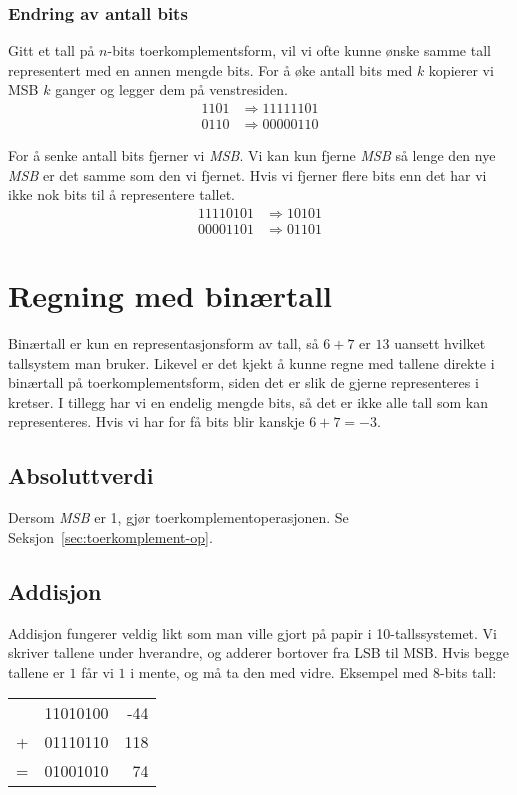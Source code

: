 \documentclass[12pt,a4paper,norsk]{article}
\begin{document}
\subsubsection{Endring av antall bits}
Gitt et tall på $n$-bits toerkomplementsform, vil vi ofte kunne ønske samme tall
representert med en annen mengde bits. For å øke antall bits med $k$ kopierer vi
MSB $k$ ganger og legger dem på venstresiden.
\begin{align*}
  1101 &\Rightarrow 11111101 \\
  0110 &\Rightarrow 00000110
\end{align*}

For å senke antall bits fjerner vi \textit{MSB}. Vi kan kun fjerne \textit{MSB}
så lenge den nye \textit{MSB} er det samme som den vi fjernet. Hvis vi fjerner
flere bits enn det har vi ikke nok bits til å representere tallet.
\begin{align*}
  11110101 &\Rightarrow 10101 \\
  00001101 &\Rightarrow 01101
\end{align*}

\section{Regning med binærtall}
Binærtall er kun en representasjonsform av tall, så $6+7$ er $13$ uansett
hvilket tallsystem man bruker. Likevel er det kjekt å kunne regne med tallene
direkte i binærtall på toerkomplementsform, siden det er slik de gjerne
representeres i kretser. I tillegg har vi en endelig mengde bits, så det er ikke
alle tall som kan representeres. Hvis vi har for få bits blir kanskje $6+7 = -3$.

\subsection{Absoluttverdi}
Dersom \textit{MSB} er 1, gjør toerkomplementoperasjonen. Se Seksjon~\ref{sec:toerkomplement-op}.

\subsection{Addisjon}
Addisjon fungerer veldig likt som man ville gjort på papir i 10-tallssystemet.
Vi skriver tallene under hverandre, og adderer bortover fra LSB til MSB. Hvis
begge tallene er $1$ får vi $1$ i mente, og må ta den med vidre. Eksempel med
8-bits tall:

\begin{center}
  \begin{tabular}{rlr}
     &11010100 & -44 \\
    +&01110110 & 118 \\
    \midrule
    =&01001010 & 74
  \end{tabular}
\end{center}
\end{document}
